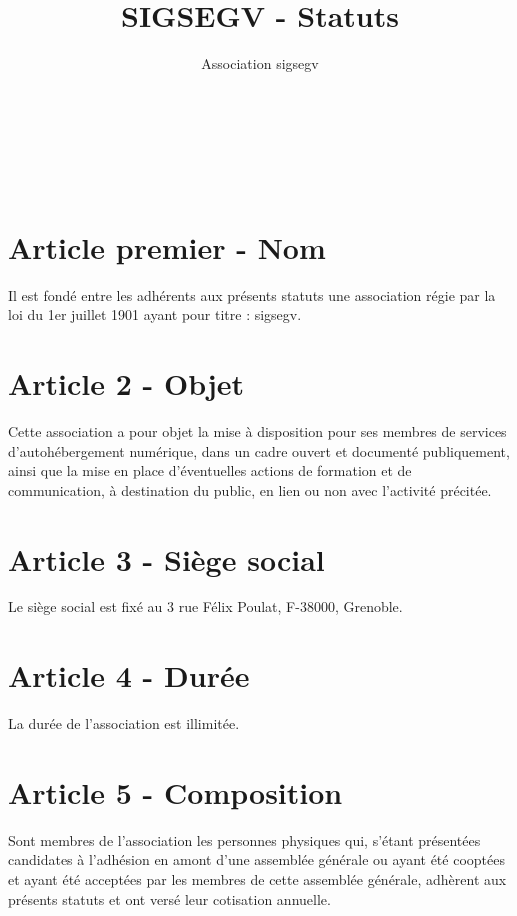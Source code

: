 \documentclass[a4paper,oneside,10pt]{article}
\begin{document}
\author{Association sigsegv}
\date{}
\title{SIGSEGV - Statuts}

{ \\
}
\vspace{5mm}
{\centering {\textbf {\Huge -}}\\
}
\vspace{5mm}
{\\
}

\section*{Article premier - Nom}

Il est fondé entre les adhérents aux présents statuts une association régie par la loi du 1er juillet 1901 ayant pour titre : sigsegv.

\section*{Article 2 - Objet}

Cette association a pour objet la mise à disposition pour ses membres de services d’autohébergement numérique, dans un cadre ouvert et documenté publiquement, ainsi que la mise en place d’éventuelles actions de formation et de communication, à destination du public, en lien ou non avec l'activité précitée.

\section*{Article 3 - Siège social}

Le siège social est fixé au 3 rue Félix Poulat, F-38000, Grenoble.

\section*{Article 4 - Durée}

La durée de l'association est illimitée.

\section*{Article 5 - Composition}

Sont membres de l’association les personnes physiques qui, s'étant présentées candidates à l'adhésion en amont d'une assemblée générale ou ayant été cooptées et ayant été acceptées par les membres de cette assemblée générale, adhèrent aux présents statuts et ont versé leur cotisation annuelle.
\end{document}
